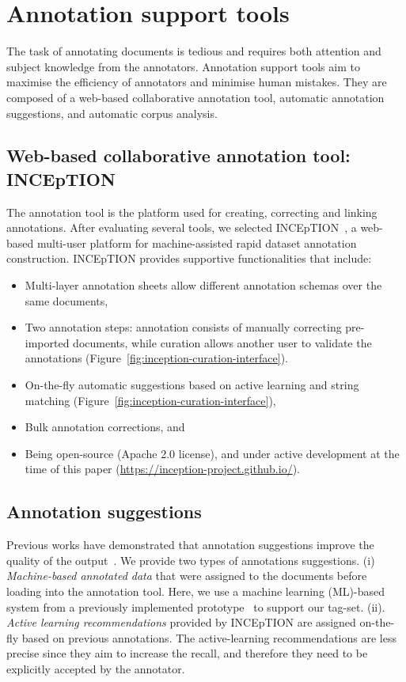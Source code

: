 \section{Annotation support tools}
\label{subsec:annotation-support-tool}
The task of annotating documents is tedious and requires both attention and subject knowledge from the annotators.
Annotation support tools aim to maximise the efficiency of annotators and minimise human mistakes. 
They are composed of a web-based collaborative annotation tool, automatic annotation suggestions, and automatic corpus analysis. 

\subsection{Web-based collaborative annotation tool: INCEpTION}
\label{subsec:annotation-tool}

The annotation tool is the platform used for creating, correcting and linking annotations.
After evaluating several tools, we selected INCEpTION~\cite{tubiblio106270,eckart-de-castilho-etal-2016-web}, a web-based multi-user platform for machine-assisted rapid dataset annotation construction. 
INCEpTION provides supportive functionalities that include: 
\begin{itemize}
    \item Multi-layer annotation sheets allow different annotation schemas over the same documents, 
    \item Two annotation steps: annotation consists of manually correcting pre-imported documents, while curation allows another user to validate the annotations (Figure~\ref{fig:inception-curation-interface}). 
    \item On-the-fly automatic suggestions based on active learning and string matching (Figure~\ref{fig:inception-curation-interface}), 
    \item Bulk annotation corrections, and 
    \item Being open-source (Apache 2.0 license), and under active development at the time of this paper (\url{https://inception-project.github.io/}).
\end{itemize}

\subsection{Annotation suggestions}
\label{subsec:automatic-system-prototype}

Previous works have demonstrated that annotation suggestions improve the quality of the output~\cite{Fort2010InfluenceOP, Nvol2011SemiautomaticSA, Lingren2014EvaluatingTI}.
We provide two types of annotations suggestions. 
(i) \textit{Machine-based annotated data} that were assigned to the documents before loading into the annotation tool. Here, we use a machine learning (ML)-based system from a previously implemented prototype~\cite{foppiano2019proposal} to support our tag-set. 
(ii). \textit{Active learning recommendations} provided by INCEpTION are assigned on-the-fly based on previous annotations. 
The active-learning recommendations are less precise since they aim to increase the recall, and therefore they need to be explicitly accepted by the annotator.

